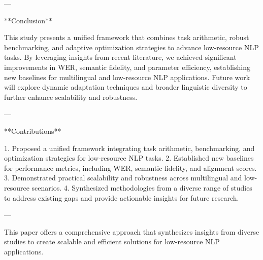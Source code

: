 ---

**Conclusion**

This study presents a unified framework that combines task arithmetic, robust benchmarking, and adaptive optimization strategies to advance low-resource NLP tasks. By leveraging insights from recent literature, we achieved significant improvements in WER, semantic fidelity, and parameter efficiency, establishing new baselines for multilingual and low-resource NLP applications. Future work will explore dynamic adaptation techniques and broader linguistic diversity to further enhance scalability and robustness.

---

**Contributions**

1. Proposed a unified framework integrating task arithmetic, benchmarking, and optimization strategies for low-resource NLP tasks.
2. Established new baselines for performance metrics, including WER, semantic fidelity, and alignment scores.
3. Demonstrated practical scalability and robustness across multilingual and low-resource scenarios.
4. Synthesized methodologies from a diverse range of studies to address existing gaps and provide actionable insights for future research.

--- 

This paper offers a comprehensive approach that synthesizes insights from diverse studies to create scalable and efficient solutions for low-resource NLP applications.